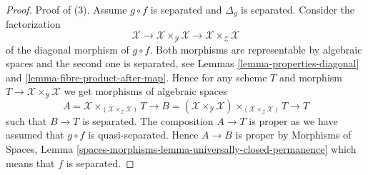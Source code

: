 \documentclass[10pt,a4paper]{amsart}
\theoremstyle{plain}
\theoremstyle{definition}
\theoremstyle{remark}
\numberwithin{equation}{subsection}
\begin{document}
\begin{proof}
\medskip\noindent
Proof of (3). Assume $g \circ f$ is separated and $\Delta_g$ is
separated. Consider the factorization
$$
\mathcal{X} \to
\mathcal{X} \times_\mathcal{Y} \mathcal{X} \to
\mathcal{X} \times_\mathcal{Z} \mathcal{X}
$$
of the diagonal morphism of $g \circ f$. Both morphisms are
representable by algebraic spaces and the second one is separated, see
Lemmas \ref{lemma-properties-diagonal} and
\ref{lemma-fibre-product-after-map}.
Hence for any scheme $T$ and morphism
$T \to \mathcal{X} \times_\mathcal{Y} \mathcal{X}$
we get morphisms of algebraic spaces
$$
A = \mathcal{X} \times_{(\mathcal{X} \times_\mathcal{Z} \mathcal{X})} T
\longrightarrow
B = (\mathcal{X} \times_\mathcal{Y} \mathcal{X})
\times_{(\mathcal{X} \times_\mathcal{Z} \mathcal{X})} T
\longrightarrow
T
$$
such that $B \to T$ is separated.
The composition $A \to T$ is proper as we have assumed that
$g \circ f$ is quasi-separated. Hence $A \to B$ is proper by
Morphisms of Spaces,
Lemma \ref{spaces-morphisms-lemma-universally-closed-permanence}
which means that $f$ is separated.
\end{proof}
\end{document}
